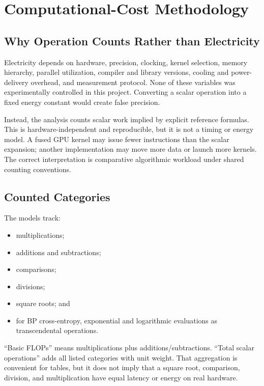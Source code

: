 \documentclass{article}
\begin{document}
    \section{Computational-Cost Methodology}
    
    \subsection{Why Operation Counts Rather than Electricity}
    
    Electricity depends on hardware, precision, clocking, kernel selection, memory hierarchy, parallel utilization, compiler and library versions, cooling and power-delivery overhead, and measurement protocol. None of these variables was experimentally controlled in this project. Converting a scalar operation into a fixed energy constant would create false precision.
    
    Instead, the analysis counts scalar work implied by explicit reference formulas. This is hardware-independent and reproducible, but it is not a timing or energy model. A fused GPU kernel may issue fewer instructions than the scalar expansion; another implementation may move more data or launch more kernels. The correct interpretation is comparative algorithmic workload under shared counting conventions.
    
    \subsection{Counted Categories}
    
    The models track:
    \begin{itemize}[noitemsep]
    \item multiplications;
    \item additions and subtractions;
    \item comparisons;
    \item divisions;
    \item square roots; and
    \item for BP cross-entropy, exponential and logarithmic evaluations as transcendental operations.
    \end{itemize}
    
    ``Basic FLOPs'' means multiplications plus additions/subtractions. ``Total scalar operations'' adds all listed categories with unit weight. That aggregation is convenient for tables, but it does not imply that a square root, comparison, division, and multiplication have equal latency or energy on real hardware.
    
\end{document}
